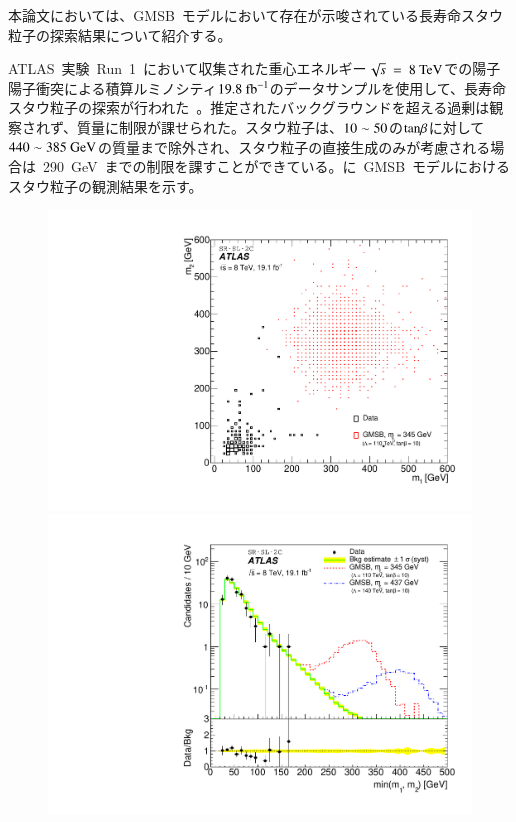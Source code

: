 本論文においては、GMSB~モデルにおいて存在が示唆されている長寿命スタウ粒子の探索結果について紹介する。

ATLAS~実験~Run~1~において収集された重心エネルギー$\sqrt{s}~=~8~\rm{TeV}$での陽子陽子衝突による積算ルミノシティ$19.8~\rm{fb}^{-1}$のデータサンプルを使用して、長寿命スタウ粒子の探索が行われた~\cite{AR:03}。推定されたバックグラウンドを超える過剰は観察されず、質量に制限が課せられた。スタウ粒子は、$\rm{10\sim50}$の$\rm{tan}\beta$に対して$\rm{440\sim385~GeV}$の質量まで除外され、スタウ粒子の直接生成のみが考慮される場合は~290~GeV~までの制限を課すことができている。に~GMSB~モデルにおけるスタウ粒子の観測結果を示す。

\begin{figure}[tbp]
    \begin{minipage}{0.49\hsize}
    \centering   
    \includegraphics[width=\textwidth]{img/stau/fig_02a.pdf}
    \subcaption{}
    \end{minipage}
    \begin{minipage}{0.49\hsize}
    \centering   
    \includegraphics[width=\textwidth]{img/stau/fig_02b.pdf}

\end{minipage}
\end{figure}
